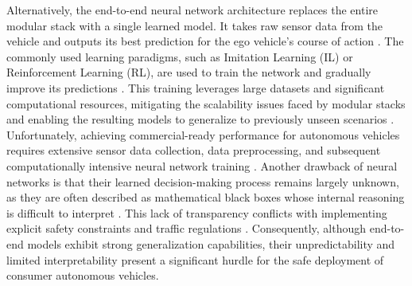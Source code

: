 Alternatively, the end-to-end neural network architecture replaces the entire modular stack with a single learned model.
It takes raw sensor data from the vehicle and outputs its best prediction for the ego vehicle's course of action \cite{jain_Autonomy_20_2021, karkus_DiffStackDifferentiableModular_2022, tampuu_SurveyEndtoEndDriving_2022,wang_VersatileEfficientReinforcement_2022, kocic_end-to-end_2019, lee_autonomous_2020, hu_learning_2021}.
The commonly used learning paradigms, such as Imitation Learning (IL) or Reinforcement Learning (RL), are used to train the network and gradually improve its predictions \cite{hu_review_2026, huang_DifferentiableIntegratedMotion_2024, karkus_DiffStackDifferentiableModular_2022, ogretmen_local_2025, tampuu_SurveyEndtoEndDriving_2022, wang_VersatileEfficientReinforcement_2022, moller_LearningSampleReinforcement2025}.
This training leverages large datasets and significant computational resources, mitigating the scalability issues faced by modular stacks and enabling the resulting models to generalize to previously unseen scenarios \cite{jain_Autonomy_20_2021, tampuu_SurveyEndtoEndDriving_2022, wang_VersatileEfficientReinforcement_2022}.
Unfortunately, achieving commercial-ready performance for autonomous vehicles requires extensive sensor data collection, data preprocessing, and subsequent computationally intensive neural network training \cite{kocic_end-to-end_2019, lee_autonomous_2020, hu_learning_2021}.
Another drawback of neural networks is that their learned decision-making process remains largely unknown, as they are often described as mathematical black boxes whose internal reasoning is difficult to interpret \cite{hu_review_2026, jain_Autonomy_20_2021, jahncke_MINDStackModularInterpretable_2025, tampuu_SurveyEndtoEndDriving_2022, wang_VersatileEfficientReinforcement_2022}.
This lack of transparency conflicts with implementing explicit safety constraints and traffic regulations \cite{hu_review_2026, huang_DifferentiableIntegratedMotion_2024, karkus_DiffStackDifferentiableModular_2022, tampuu_SurveyEndtoEndDriving_2022, wang_VersatileEfficientReinforcement_2022}.
Consequently, although end-to-end models exhibit strong generalization capabilities, their unpredictability and limited interpretability present a significant hurdle for the safe deployment of consumer autonomous vehicles.

